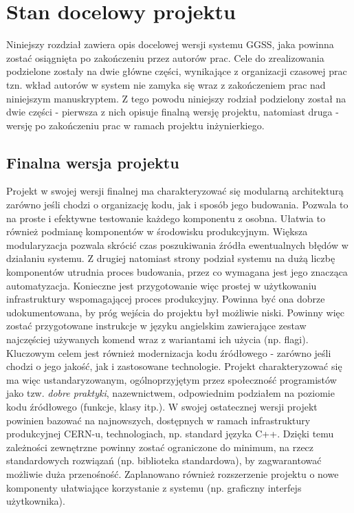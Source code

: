 \chapter{Stan docelowy projektu}
\label{cha:docel}
Niniejszy rozdział zawiera opis docelowej wersji systemu GGSS, jaka powinna zostać osiągnięta po zakończeniu przez autorów prac. Cele do zrealizowania podzielone zostały na dwie główne części, wynikające z organizacji czasowej prac tzn. wkład autorów w system nie zamyka się wraz z zakończeniem prac nad niniejszym manuskryptem. Z tego powodu niniejszy rodział podzielony został na dwie części - pierwsza z nich opisuje finalną wersję projektu, natomiast druga - wersję po zakończeniu prac w ramach projektu inżynierkiego.

\section{Finalna wersja projektu}
Projekt w swojej wersji finalnej ma charakteryzować się modularną architekturą zarówno jeśli chodzi o organizację kodu, jak i sposób jego budowania. Pozwala to na proste i efektywne testowanie każdego komponentu z osobna. Ułatwia to również podmianę komponentów w środowisku produkcyjnym. Większa modularyzacja pozwala skrócić czas poszukiwania źródła ewentualnych błędów w działaniu systemu. Z drugiej natomiast strony podział systemu na dużą liczbę komponentów utrudnia proces budowania, przez co wymagana jest jego znacząca automatyzacja. Konieczne jest przygotowanie więc prostej w użytkowaniu infrastruktury wspomagającej proces produkcyjny. Powinna być ona dobrze udokumentowana, by próg wejścia do projektu był możliwie niski. Powinny więc zostać przygotowane instrukcje w języku angielskim zawierające zestaw najczęściej używanych komend wraz z wariantami ich użycia (np. flagi). Kluczowym celem jest również modernizacja kodu źródłowego - zarówno jeśli chodzi o jego jakość, jak i zastosowane technologie. Projekt charakteryzować się ma więc ustandaryzowanym, ogólnoprzyjętym przez społeczność programistów jako tzw. \textit{dobre praktyki}, nazewnictwem, odpowiednim podziałem na poziomie kodu źródłowego (funkcje, klasy itp.). W swojej ostatecznej wersji projekt powinien bazować na najnowszych, dostępnych w ramach infrastruktury produkcyjnej CERN-u, technologiach, np. standard języka C++. Dzięki temu zależności zewnętrzne powinny zostać ograniczone do minimum, na rzecz standardowych rozwiązań (np. biblioteka standardowa), by zagwarantować możliwie duża przenośność. Zaplanowano również rozszerzenie projektu o nowe komponenty ułatwiające korzystanie z systemu (np. graficzny interfejs użytkownika).

